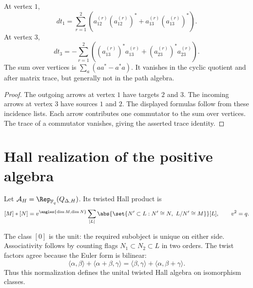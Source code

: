 \begin{calculation}
At vertex $1$,
\[
 d t_1=
 \sum_{r=1}^2
 \left(
 a_{12}^{(r)}(a_{12}^{(r)})^*
 +a_{13}^{(r)}(a_{13}^{(r)})^*
 \right).
\]
At vertex $3$,
\[
 d t_3=-\sum_{r=1}^2\left(
 (a_{13}^{(r)})^*a_{13}^{(r)}+
 (a_{23}^{(r)})^*a_{23}^{(r)}\right).
\]
The sum over vertices is $\sum_a(aa^*-a^*a)$.
It vanishes in the cyclic quotient and after matrix trace,
but generally not in the path algebra.
\end{calculation}
\begin{proof}
The outgoing arrows at vertex $1$ have targets $2$ and $3$.
The incoming arrows at vertex $3$ have sources $1$ and $2$.
The displayed formulas follow from these incidence lists.
Each arrow contributes one commutator to the sum over vertices.
The trace of a commutator vanishes, giving the asserted trace identity.
\end{proof}


\chapter{Hall realization of the positive algebra}
Let $\mathcal A_H=\Rep_{\mathbb F_q}(Q_{\Delta,H})$.  Its twisted Hall product is
\[
 [M]*[N]
 =v^{\angles{\dim M,\dim N}}
 \sum_{[L]}
 \abs{\set{N'\subset L:N'\cong N,\ L/N'\cong M}}
 [L],
 \qquad v^2=q.
\]

The class $[0]$ is the unit: the required subobject is unique on either
side. Associativity follows by counting flags $N_1\subset N_2\subset L$
in two orders. The twist factors agree because the Euler form is
bilinear:
\[
 \langle\alpha,\beta\rangle+\langle\alpha+\beta,\gamma\rangle
 =\langle\beta,\gamma\rangle+\langle\alpha,\beta+\gamma\rangle.
\]
Thus this normalization defines the unital twisted Hall algebra on
isomorphism classes.

